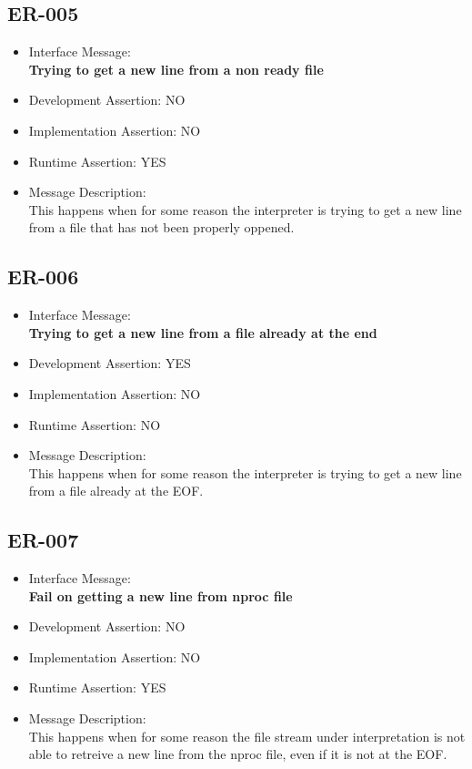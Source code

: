 \subsection{ER-005}
\begin{itemize}
  \item Interface Message:\\[1em]
    \textbf{Trying to get a new line from a non ready file}
  \item Development Assertion: NO
  \item Implementation Assertion: NO
  \item Runtime Assertion: YES
  \item Message Description:\\[1em]
    This happens when for some reason the interpreter is trying to get a new line from a file that has not been properly oppened.
\end{itemize}

\subsection{ER-006}
\begin{itemize}
  \item Interface Message:\\[1em]
    \textbf{Trying to get a new line from a file already at the end}
  \item Development Assertion: YES
  \item Implementation Assertion: NO
  \item Runtime Assertion: NO
  \item Message Description:\\[1em]
    This happens when for some reason the interpreter is trying to get a new line from a file already at the EOF.
\end{itemize}

\subsection{ER-007}
\begin{itemize}
  \item Interface Message:\\[1em]
    \textbf{Fail on getting a new line from nproc file}
  \item Development Assertion: NO
  \item Implementation Assertion: NO
  \item Runtime Assertion: YES
  \item Message Description:\\[1em]
    This happens when for some reason the file stream under interpretation is not able to retreive a new line from the nproc file, even if it is not at the EOF.
\end{itemize}


